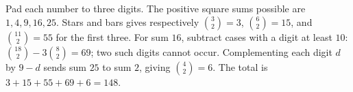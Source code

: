 Pad each number to three digits. The positive square sums possible are $ 1,4,9,16,25 $. Stars and bars gives respectively $\binom32=3 $, $\binom62=15 $, and $\binom{11}{2}=55 $ for the first three. For sum $ 16 $, subtract cases with a digit at least $ 10 $: $\binom{18}{2}-3\binom82=69 $; two such digits cannot occur. Complementing each digit $ d $ by $ 9-d $ sends sum $ 25 $ to sum $ 2 $, giving $\binom42=6 $. The total is $ 3+15+55+69+6=\boxed{148}$.

